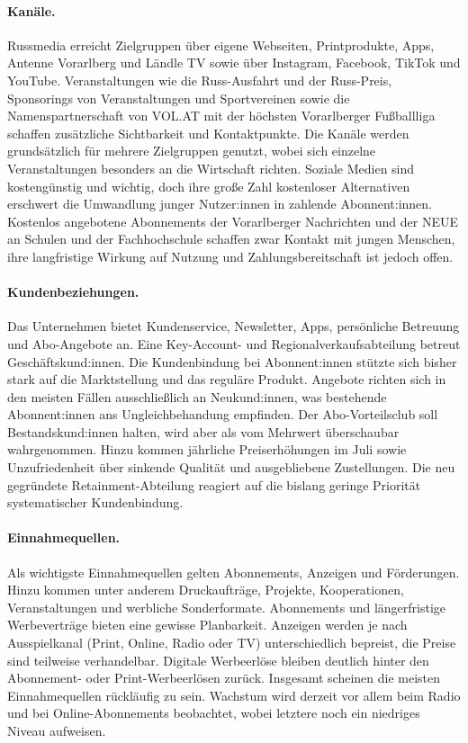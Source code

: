 \paragraph*{Kanäle.}
Russmedia erreicht Zielgruppen über eigene Webseiten, Printprodukte, Apps, Antenne Vorarlberg und Ländle TV sowie über Instagram, Facebook, TikTok und YouTube. Veranstaltungen wie die Russ-Ausfahrt und der Russ-Preis, Sponsorings von Veranstaltungen und Sportvereinen sowie die Namenspartnerschaft von VOL.AT mit der höchsten Vorarlberger Fußballliga schaffen zusätzliche Sichtbarkeit und Kontaktpunkte. Die Kanäle werden grundsätzlich für mehrere Zielgruppen genutzt, wobei sich einzelne Veranstaltungen besonders an die Wirtschaft richten. Soziale Medien sind kostengünstig und wichtig, doch ihre große Zahl kostenloser Alternativen erschwert die Umwandlung junger Nutzer:innen in zahlende Abonnent:innen. Kostenlos angebotene Abonnements der Vorarlberger Nachrichten und der NEUE an Schulen und der Fachhochschule schaffen zwar Kontakt mit jungen Menschen, ihre langfristige Wirkung auf Nutzung und Zahlungsbereitschaft ist jedoch offen.

\paragraph*{Kundenbeziehungen.}
Das Unternehmen bietet Kundenservice, Newsletter, Apps, persönliche Betreuung und Abo-Angebote an. Eine Key-Account- und Regionalverkaufsabteilung betreut Geschäftskund:innen. Die Kundenbindung bei Abonnent:innen stützte sich bisher stark auf die Marktstellung und das reguläre Produkt. Angebote richten sich in den meisten Fällen ausschließlich an Neukund:innen, was bestehende Abonnent:innen ans Ungleichbehandung empfinden. Der Abo-Vorteilsclub soll Bestandskund:innen halten, wird aber als vom Mehrwert überschaubar wahrgenommen. Hinzu kommen jährliche Preiserhöhungen im Juli sowie Unzufriedenheit über sinkende Qualität und ausgebliebene Zustellungen. Die neu gegründete Retainment-Abteilung reagiert auf die bislang geringe Priorität systematischer Kundenbindung.

\paragraph*{Einnahmequellen.}
Als wichtigste Einnahmequellen gelten Abonnements, Anzeigen und Förderungen. Hinzu kommen unter anderem Druckaufträge, Projekte, Kooperationen, Veranstaltungen und werbliche Sonderformate. Abonnements und längerfristige Werbeverträge bieten eine gewisse Planbarkeit. Anzeigen werden je nach Ausspielkanal (Print, Online, Radio oder TV) unterschiedlich bepreist, die Preise sind teilweise verhandelbar. Digitale Werbeerlöse bleiben deutlich hinter den Abonnement- oder Print-Werbeerlösen zurück. Insgesamt scheinen die meisten Einnahmequellen rückläufig zu sein. Wachstum wird derzeit vor allem beim Radio und bei Online-Abonnements beobachtet, wobei letztere noch ein niedriges Niveau aufweisen.

